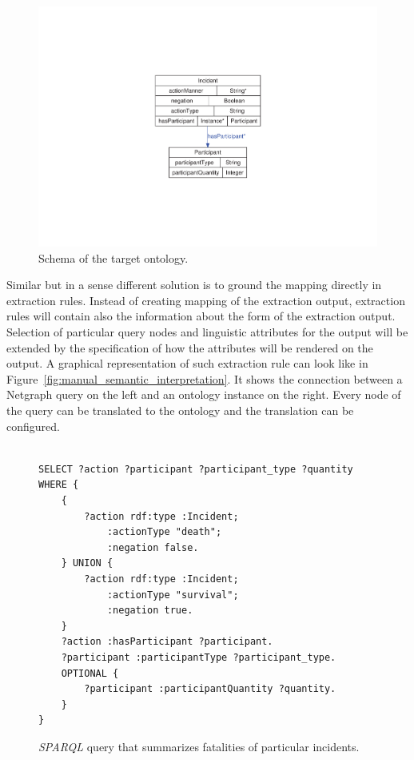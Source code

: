 \begin{figure}
	\centering
		\includegraphics[angle=-90, width=\hsize]{classes}
	\caption{Schema of the target ontology.}
	\label{fig:manual_classes}
\end{figure}



Similar but in a sense different solution is to ground the mapping directly in extraction rules. Instead of creating mapping of the extraction output, extraction rules will contain also the information about the form of the extraction output. Selection of particular query nodes and linguistic attributes for the output will be extended by the specification of how the attributes will be rendered on the output. A graphical representation of such extraction rule can look like in Figure~\ref{fig:manual_semantic_interpretation}. It shows the connection between a Netgraph query on the left and an ontology instance on the right. Every node of the query can be translated to the ontology and the translation can be configured. 


\begin{figure}[b!]
\begin{verbatim}

SELECT ?action ?participant ?participant_type ?quantity
WHERE {
	{
		?action rdf:type :Incident;
			:actionType "death";
			:negation false.
	} UNION {
		?action rdf:type :Incident;
			:actionType "survival";
			:negation true.
	}
	?action :hasParticipant ?participant.
	?participant :participantType ?participant_type.
	OPTIONAL {
		?participant :participantQuantity ?quantity.
	}
}
\end{verbatim}
\caption{\emph{SPARQL} query that summarizes fatalities of particular incidents.}
\label{fig:sparql_aggregation}
\end{figure}


